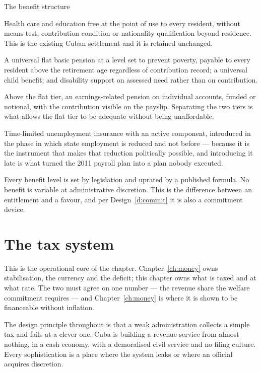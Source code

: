 \begin{design}{The benefit structure}
\label{d:benefit}
\begin{rules}
 Health care and education free at the point of use to
every resident, without means test, contribution condition or nationality
qualification beyond residence. This is the existing Cuban settlement and it is
retained unchanged.

 A universal flat basic pension at a level set to
prevent poverty, payable to every resident above the retirement age regardless
of contribution record; a universal child benefit; and disability support on
assessed need rather than on contribution.

 Above the flat tier, an earnings-related
pension on individual accounts, funded or notional, with the contribution
visible on the payslip. Separating the two tiers is what allows the flat tier to
be adequate without being unaffordable.

 Time-limited unemployment insurance with an active
component, introduced in the phase in which state employment is reduced and not
before --- because it is the instrument that makes that reduction politically
possible, and introducing it late is what turned the 2011 payroll plan into a
plan nobody executed.

 Every benefit level is set by legislation
and uprated by a published formula. No benefit is variable at administrative
discretion. This is the difference between an entitlement and a favour, and per
Design~\ref{d:commit} it is also a commitment device.
\end{rules}
\end{design}

\section{The tax system}

This is the operational core of the chapter. Chapter~\ref{ch:money} owns
stabilisation, the currency and the deficit; this chapter owns what is taxed and
at what rate. The two must agree on one number --- the revenue share the welfare
commitment requires --- and Chapter~\ref{ch:money} is where it is shown to be
financeable without inflation.

The design principle throughout is that a weak administration collects a simple
tax and fails at a clever one. Cuba is building a revenue service from almost
nothing, in a cash economy, with a demoralised civil service and no filing
culture. Every sophistication is a place where the system leaks or where an
official acquires discretion.


